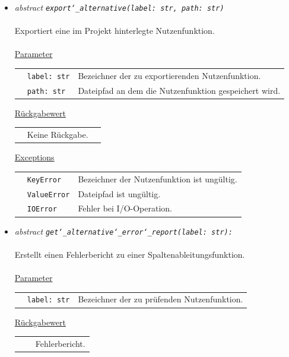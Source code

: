 \documentclass{article}
\newcommand{\classref}[1]{\texttt{\nameref{cls:#1}}}
\begin{document}
\begin{itemize}
\item \textit{\flqq{}abstract\frqq} \texttt{\textit{export\char`_alternative(label: str, path: str)}}\\\\
Exportiert eine im Projekt hinterlegte Nutzenfunktion.
\\\\
\underline{Parameter}\\
\begin{tabular}{lll}
 & \texttt{label: str} & Bezeichner der zu exportierenden Nutzenfunktion.\\
 & \texttt{path: str} & Dateipfad an dem die Nutzenfunktion gespeichert wird.\\
\end{tabular}

\underline{Rückgabewert}\\
\begin{tabular}{lll}
 & Keine Rückgabe.\\
\end{tabular}

\underline{Exceptions}\\
\begin{tabular}{lll}
 & \texttt{KeyError} & Bezeichner der Nutzenfunktion ist ungültig.\\
 & \texttt{ValueError} & Dateipfad ist ungültig.\\
 & \texttt{IOError} & Fehler bei I/O-Operation.\\
\end{tabular}


\item \textit{\flqq{}abstract\frqq} \texttt{\textit{get\char`_alternative\char`_error\char`_report(label: str): \classref{ErrorReport}}}\\\\
Erstellt einen Fehlerbericht zu einer Spaltenableitungsfunktion.
\\\\
\underline{Parameter}\\
\begin{tabular}{lll}
 & \texttt{label: str} & Bezeichner der zu prüfenden Nutzenfunktion.\\
\end{tabular}

\underline{Rückgabewert}\\
\begin{tabular}{lll}
 & \classref{ErrorReport} & Fehlerbericht.\\
\end{tabular}


\end{itemize}
\end{document}
